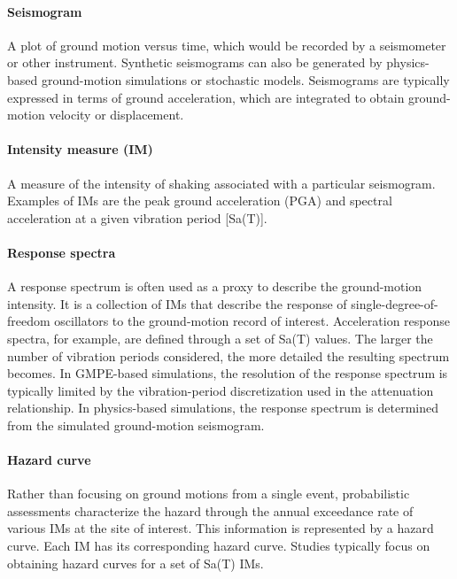 \paragraph{Seismogram} A plot of ground motion versus time, which would be recorded by a seismometer or other instrument. Synthetic seismograms can also be generated by physics-based ground-motion simulations or stochastic models. Seismograms are typically expressed in terms of ground acceleration, which are integrated to obtain ground-motion velocity or displacement. 

\paragraph{Intensity measure (IM)} A measure of the intensity of shaking associated with a particular seismogram. Examples of IMs are the peak ground acceleration (PGA) and spectral acceleration at a given vibration period [Sa(T)].

\paragraph{Response spectra} A response spectrum is often used as a proxy to describe the ground-motion intensity. It is a collection of IMs that describe the response of single-degree-of-freedom oscillators to the ground-motion record of interest. Acceleration response spectra, for example, are defined through a set of Sa(T) values. The larger the number of vibration periods considered, the more detailed the resulting spectrum becomes. In GMPE-based simulations, the resolution of the response spectrum is typically limited by the vibration-period discretization used in the attenuation relationship. In physics-based simulations, the response spectrum is determined from the simulated ground-motion seismogram.

\paragraph{Hazard curve } Rather than focusing on ground motions from a single event, probabilistic assessments characterize the hazard through the annual exceedance rate of various IMs at the site of interest. This information is represented by a hazard curve. Each IM has its corresponding hazard curve. Studies typically focus on obtaining hazard curves for a set of Sa(T) IMs. 

